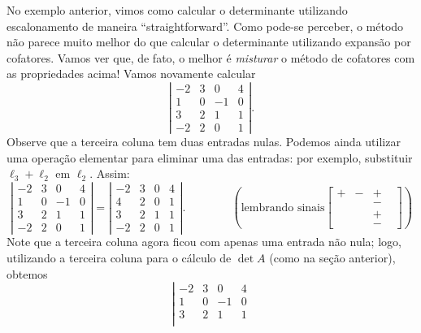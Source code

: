 \documentclass[../livro.tex]{subfiles}  %
\begin{document}
\begin{remark}
No exemplo anterior, vimos como calcular o determinante utilizando escalonamento de maneira ``straightforward''. Como pode-se perceber, o método não parece muito melhor do que calcular o determinante utilizando expansão por cofatores. Vamos ver que, de fato, o melhor é \textit{misturar} o método de cofatores com as propriedades acima! Vamos novamente calcular
\begin{equation}
\left| \begin{matrix}
-2 & 3 & 0  & 4 \\
1  & 0 & -1 & 0 \\
3  & 2 & 1  & 1 \\
-2 & 2 & 0  & 1
\end{matrix}
\right|.
\end{equation} Observe que a terceira coluna tem duas entradas nulas. Podemos ainda utilizar uma operação elementar para eliminar uma das entradas: por exemplo, substituir $\ell_3 + \ell_2$ em $\ell_2$. Assim:
\begin{equation}
\left| \begin{matrix}
-2 & 3 & 0  & 4 \\
1  & 0 & -1 & 0 \\
3  & 2 & 1  & 1 \\
-2 & 2 & 0  & 1
\end{matrix}
\right| = 
\left| \begin{matrix}
-2 & 3 & 0  & 4 \\
4  & 2 & 0  & 1 \\
3  & 2 & 1  & 1 \\
-2 & 2 & 0  & 1
\end{matrix}
\right|. \qquad  \qquad \left(  \text{lembrando sinais}
\begin{bmatrix}
+ & - & + &  \\
  &   & - &  \\
  &   & + &  \\
  &   & - & 
\end{bmatrix}
\right) 
\end{equation} Note que a terceira coluna agora ficou com apenas uma entrada não nula; logo, utilizando a terceira coluna para o cálculo de $\det A$ (como na seção anterior), obtemos
\begin{equation}
\left| \begin{matrix}
-2 & 3 & 0  & 4 \\
1  & 0 & -1 & 0 \\
3  & 2 & 1  & 1 \\

\end{matrix}
\end{equation}
\end{remark}
\end{document}
